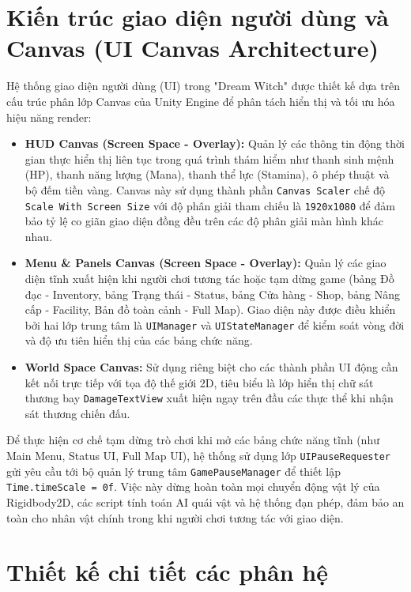\documentclass[../DoAn.tex]{subfiles}
\begin{document}
\section{Kiến trúc giao diện người dùng và Canvas (UI Canvas Architecture)}
\label{section:4.5}

Hệ thống giao diện người dùng (UI) trong "Dream Witch" được thiết kế dựa trên cấu trúc phân lớp Canvas của Unity Engine để phân tách hiển thị và tối ưu hóa hiệu năng render:
\begin{itemize}
    \item \textbf{HUD Canvas (Screen Space - Overlay):} Quản lý các thông tin động thời gian thực hiển thị liên tục trong quá trình thám hiểm như thanh sinh mệnh (HP), thanh năng lượng (Mana), thanh thể lực (Stamina), ô phép thuật và bộ đếm tiền vàng. Canvas này sử dụng thành phần \texttt{Canvas Scaler} chế độ \texttt{Scale With Screen Size} với độ phân giải tham chiếu là \texttt{1920x1080} để đảm bảo tỷ lệ co giãn giao diện đồng đều trên các độ phân giải màn hình khác nhau.
    \item \textbf{Menu \& Panels Canvas (Screen Space - Overlay):} Quản lý các giao diện tĩnh xuất hiện khi người chơi tương tác hoặc tạm dừng game (bảng Đồ đạc - Inventory, bảng Trạng thái - Status, bảng Cửa hàng - Shop, bảng Nâng cấp - Facility, Bản đồ toàn cảnh - Full Map). Giao diện này được điều khiển bởi hai lớp trung tâm là \texttt{UIManager} và \texttt{UIStateManager} để kiểm soát vòng đời và độ ưu tiên hiển thị của các bảng chức năng.
    \item \textbf{World Space Canvas:} Sử dụng riêng biệt cho các thành phần UI động cần kết nối trực tiếp với tọa độ thế giới 2D, tiêu biểu là lớp hiển thị chữ sát thương bay \texttt{DamageTextView} xuất hiện ngay trên đầu các thực thể khi nhận sát thương chiến đấu.
\end{itemize}

Để thực hiện cơ chế tạm dừng trò chơi khi mở các bảng chức năng tĩnh (như Main Menu, Status UI, Full Map UI), hệ thống sử dụng lớp \texttt{UIPauseRequester} gửi yêu cầu tới bộ quản lý trung tâm \texttt{GamePauseManager} để thiết lập \texttt{Time.timeScale = 0f}. Việc này dừng hoàn toàn mọi chuyển động vật lý của Rigidbody2D, các script tính toán AI quái vật và hệ thống đạn phép, đảm bảo an toàn cho nhân vật chính trong khi người chơi tương tác với giao diện.

\section{Thiết kế chi tiết các phân hệ}
\label{section:4.6}
\end{document}
